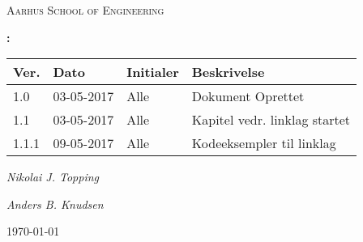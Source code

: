 \begin{titlepage}
	\centering
	{\scshape\LARGE Aarhus School of Engineering \par}
	\vspace{1cm}
	{\huge\bfseries \Kursus : \OpgaveTitel \par}
	\vspace{.5cm}
	{\large\bfseries \GruppeNummer \par}
	\vspace{5cm}
	\begin{center}
		\large\begin{tabular}{| l | l | l | l |}
			\hline
			\textbf{Ver.} & \textbf{Dato} & \textbf{Initialer} & \textbf{Beskrivelse} \\ \hline
			1.0 & 03-05-2017 & Alle & Dokument Oprettet \\ \hline
			1.1 & 03-05-2017 & Alle & Kapitel vedr. linklag startet \\ \hline
			1.1.1 & 09-05-2017 & Alle & Kodeeksempler til linklag \\
			\hline
		\end{tabular}
	\end{center}
	\vspace{5cm}
	{\Large\itshape Nikolai J. Topping\par}
	{\Large\itshape Anders B. Knudsen\par}
	{\large \today\par}
\end{titlepage}